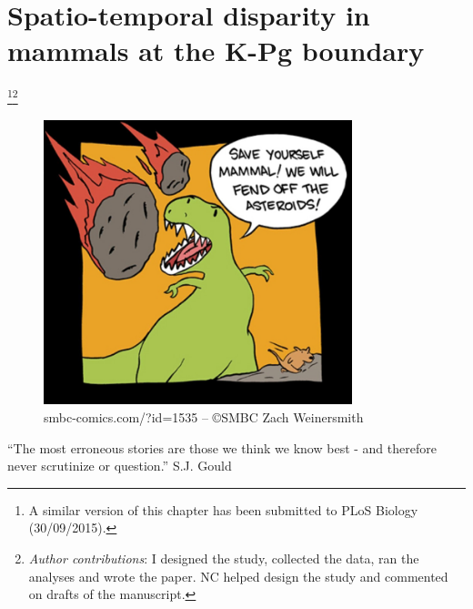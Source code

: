 

%
%

\chapter[Spatio-temporal disparity in mammals at the K-Pg boundary]{Spatio-temporal disparity in mammals at the K-Pg boundary}
\label{chap:STD_paper}

\bigskip
\begin{center}

\footnote{A similar version of this chapter has been submitted to PLoS Biology (30/09/2015).}\footnote{\textit{Author contributions}: I designed the study, collected the data, ran the analyses and wrote the paper. NC helped design the study and commented on drafts of the manuscript.} \\

\begin{figure}[h]
  \centering
  \includegraphics[width=0.8\textwidth]{STD/Figures/SMBC-ZachWeinersmith.jpg}
  \caption*{smbc-comics.com/?id=1535 -- \copyright SMBC Zach Weinersmith}
\end{figure}

\begin{quoteshrink}
  ``The most erroneous stories are those we think we know best - and therefore never scrutinize or question.''
\hfill{S.J. Gould}
\end{quoteshrink}
\bigskip


\end{center}
%
%
